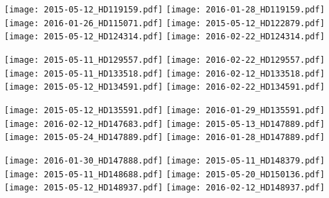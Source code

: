 \documentclass[a4paper]{aa}
\begin{document}
\noindent
  \texttt{[image: 2015-05-12\_HD119159.pdf]}
  \texttt{[image: 2016-01-28\_HD119159.pdf]}\\
  \texttt{[image: 2016-01-26\_HD115071.pdf]}
  \texttt{[image: 2015-05-12\_HD122879.pdf]}\\
  \texttt{[image: 2015-05-12\_HD124314.pdf]}
  \texttt{[image: 2016-02-22\_HD124314.pdf]}
\newpage

\noindent
  \texttt{[image: 2015-05-11\_HD129557.pdf]}
  \texttt{[image: 2016-02-22\_HD129557.pdf]}\\
  \texttt{[image: 2015-05-11\_HD133518.pdf]}
  \texttt{[image: 2016-02-12\_HD133518.pdf]}\\
  \texttt{[image: 2015-05-12\_HD134591.pdf]}
  \texttt{[image: 2016-02-22\_HD134591.pdf]}
\newpage

\noindent
  \texttt{[image: 2015-05-12\_HD135591.pdf]}
  \texttt{[image: 2016-01-29\_HD135591.pdf]}\\
  \texttt{[image: 2016-02-12\_HD147683.pdf]}
  \texttt{[image: 2015-05-13\_HD147889.pdf]}\\
  \texttt{[image: 2015-05-24\_HD147889.pdf]}
  \texttt{[image: 2016-01-28\_HD147889.pdf]}

\newpage
\noindent
  \texttt{[image: 2016-01-30\_HD147888.pdf]}
  \texttt{[image: 2015-05-11\_HD148379.pdf]}\\
  \texttt{[image: 2015-05-11\_HD148688.pdf]}
  \texttt{[image: 2015-05-20\_HD150136.pdf]}\\
  \texttt{[image: 2015-05-12\_HD148937.pdf]}
  \texttt{[image: 2016-02-12\_HD148937.pdf]}
\newpage
\end{document}
